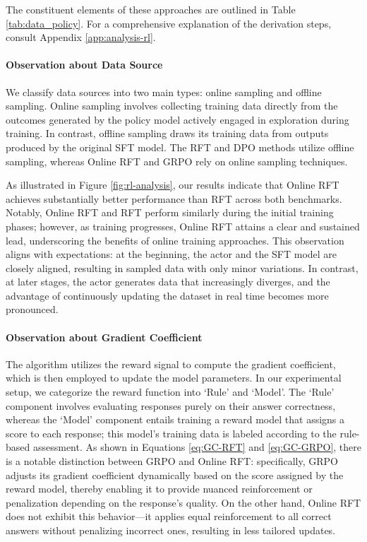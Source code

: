 \begin{itemize}[topsep=0pt]
The constituent elements of these approaches are outlined in Table \ref{tab:data_policy}. For a comprehensive explanation of the derivation steps, consult Appendix \ref{app:analysis-rl}.

\paragraph{Observation about Data Source} We classify data sources into two main types: online sampling and offline sampling. Online sampling involves collecting training data directly from the outcomes generated by the policy model actively engaged in exploration during training. In contrast, offline sampling draws its training data from outputs produced by the original SFT model. The RFT and DPO methods utilize offline sampling, whereas Online RFT and GRPO rely on online sampling techniques.

As illustrated in Figure \ref{fig:rl-analysis}, our results indicate that Online RFT achieves substantially better performance than RFT across both benchmarks. Notably, Online RFT and RFT perform similarly during the initial training phases; however, as training progresses, Online RFT attains a clear and sustained lead, underscoring the benefits of online training approaches. This observation aligns with expectations: at the beginning, the actor and the SFT model are closely aligned, resulting in sampled data with only minor variations. In contrast, at later stages, the actor generates data that increasingly diverges, and the advantage of continuously updating the dataset in real time becomes more pronounced.

\paragraph{Observation about Gradient Coefficient} The algorithm utilizes the reward signal to compute the gradient coefficient, which is then employed to update the model parameters. In our experimental setup, we categorize the reward function into `Rule' and `Model'. The `Rule' component involves evaluating responses purely on their answer correctness, whereas the `Model' component entails training a reward model that assigns a score to each response; this model's training data is labeled according to the rule-based assessment. As shown in Equations \ref{eq:GC-RFT} and \ref{eq:GC-GRPO}, there is a notable distinction between GRPO and Online RFT: specifically, GRPO adjusts its gradient coefficient dynamically based on the score assigned by the reward model, thereby enabling it to provide nuanced reinforcement or penalization depending on the response's quality. On the other hand, Online RFT does not exhibit this behavior—it applies equal reinforcement to all correct answers without penalizing incorrect ones, resulting in less tailored updates.


\end{itemize}
